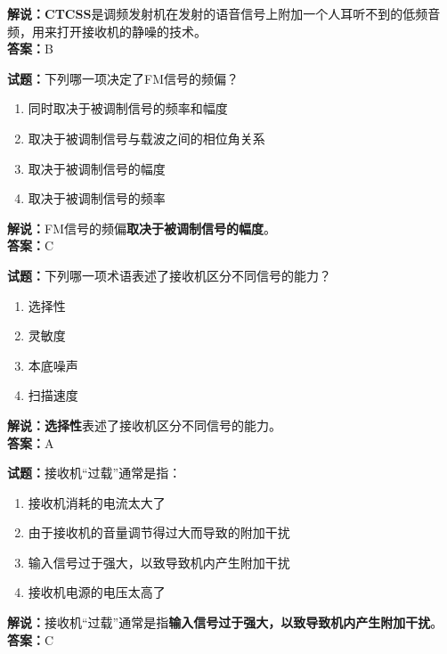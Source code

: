 \documentclass{ctexbook}
\begin{document}
\noindent\textbf{解说：}\textbf{CTCSS}是调频发射机在发射的语音信号上附加一个人耳听不到的低频音频，用来打开接收机的静噪的技术。\\\noindent\textbf{答案：}B%

\vspace{\baselineskip}

\noindent\textbf{试题：}下列哪一项决定了FM信号的频偏？

\begin{enumerate}[leftmargin=3em]
  \item 同时取决于被调制信号的频率和幅度
  \item 取决于被调制信号与载波之间的相位角关系
  \item 取决于被调制信号的幅度
  \item 取决于被调制信号的频率
\end{enumerate}

\noindent\textbf{解说：}FM信号的频偏\textbf{取决于被调制信号的幅度}。\\\noindent\textbf{答案：}C%

\vspace{\baselineskip}

\noindent\textbf{试题：}下列哪一项术语表述了接收机区分不同信号的能力？

\begin{enumerate}[leftmargin=3em]
  \item 选择性
  \item 灵敏度
  \item 本底噪声
  \item 扫描速度
\end{enumerate}

\noindent\textbf{解说：}\textbf{选择性}表述了接收机区分不同信号的能力。\\\noindent\textbf{答案：}A%

\vspace{\baselineskip}

\noindent\textbf{试题：}接收机“过载”通常是指：

\begin{enumerate}[leftmargin=3em]
  \item 接收机消耗的电流太大了
  \item 由于接收机的音量调节得过大而导致的附加干扰
  \item 输入信号过于强大，以致导致机内产生附加干扰
  \item 接收机电源的电压太高了
\end{enumerate}

\noindent\textbf{解说：}接收机“过载”通常是指\textbf{输入信号过于强大，以致导致机内产生附加干扰}。\\\noindent\textbf{答案：}C%
\end{document}
